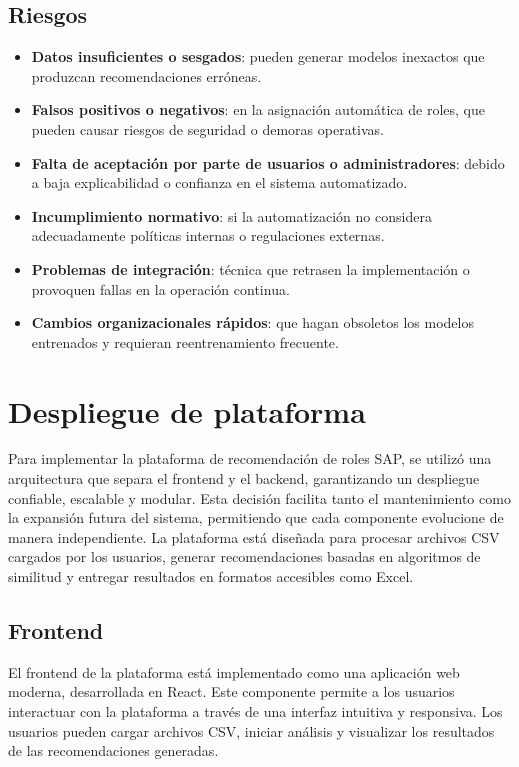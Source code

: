 \documentclass[11pt,letterpaper]{article}
\begin{document}
\begin{itemize}
\subsection{Riesgos}
\begin{itemize}
    \item \textbf{Datos insuficientes o sesgados}: pueden generar modelos inexactos que produzcan recomendaciones erróneas.
    \item \textbf{Falsos positivos o negativos}: en la asignación automática de roles, que pueden causar riesgos de seguridad o demoras operativas.
    \item \textbf{Falta de aceptación por parte de usuarios o administradores}: debido a baja explicabilidad o confianza en el sistema automatizado.
    \item \textbf{Incumplimiento normativo}: si la automatización no considera adecuadamente políticas internas o regulaciones externas.
    \item \textbf{Problemas de integración}: técnica que retrasen la implementación o provoquen fallas en la operación continua.
    \item \textbf{Cambios organizacionales rápidos}: que hagan obsoletos los modelos entrenados y requieran reentrenamiento frecuente.
\end{itemize}

\section{Despliegue de plataforma}

Para implementar la plataforma de recomendación de roles SAP, se utilizó una arquitectura que separa el frontend y el backend, garantizando un despliegue confiable, escalable y modular. Esta decisión facilita tanto el mantenimiento como la expansión futura del sistema, permitiendo que cada componente evolucione de manera independiente. La plataforma está diseñada para procesar archivos CSV cargados por los usuarios, generar recomendaciones basadas en algoritmos de similitud y entregar resultados en formatos accesibles como Excel.
\subsection{Frontend}

El frontend de la plataforma está implementado como una aplicación web moderna, desarrollada en React. Este componente permite a los usuarios interactuar con la plataforma a través de una interfaz intuitiva y responsiva. Los usuarios pueden cargar archivos CSV, iniciar análisis y visualizar los resultados de las recomendaciones generadas.


\end{itemize}
\end{document}
